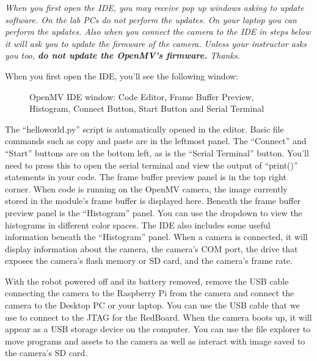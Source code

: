 \documentclass[11pt]{article}
\begin{document}
\textit{When you first open the IDE, you may receive pop up windows asking to update software. On the lab PCs do not perform the updates. On your laptop you can perform the updates. Also when you connect the camera to the IDE in steps below it will ask you to update the firmware of the camera. Unless your instructor asks you too, \textbf{do not update the OpenMV’s firmware.} Thanks.}

When you first open the IDE, you’ll see the following window:
%
\begin{figure}[H]
    \centering
    \caption{OpenMV IDE window: Code Editor, Frame Buffer Preview, Histogram, Connect Button, Start Button and Serial Terminal}
\end{figure}
%
The “helloworld.py” script is automatically opened in the editor. Basic file commands such as copy and paste are in the leftmost panel. The “Connect” and “Start” buttons are on the bottom left, as is the “Serial Terminal” button. You’ll need to press this to open the serial terminal and view the output of “print()” statements in your code. The frame buffer preview panel is in the top right corner. When code is running on the OpenMV camera, the image currently stored in the module’s frame buffer is displayed here. Beneath the frame buffer preview panel is the “Histogram” panel. You can use the dropdown to view the histograms in different color spaces. The IDE also includes some useful information beneath the “Histogram” panel. When a camera is connected, it will display information about the camera, the camera’s COM port, the drive that exposes the camera’s flash memory or SD card, and the camera’s frame rate.

With the robot powered off and its battery removed, remove the USB cable connecting the camera to the Raspberry Pi from the camera and connect the camera to the Desktop PC or your laptop. You can use the USB cable that we use to connect to the JTAG for the RedBoard. When the camera boots up, it will appear as a USB storage device on the computer. You can use the file explorer to move programs and assets to the camera as well as interact with image saved to the camera’s SD card.
\end{document}
